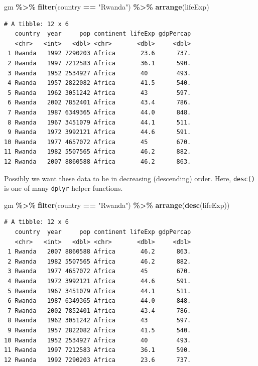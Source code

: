 \documentclass[
]{krantz}
\makeatletter
\newenvironment{Shaded}{\begin{snugshade}}{\end{snugshade}}
\newcommand{\KeywordTok}[1]{\textcolor[rgb]{0.27,0.27,0.27}{\textbf{#1}}}
\newcommand{\NormalTok}[1]{#1}
\newcommand{\OperatorTok}[1]{\textcolor[rgb]{0.43,0.43,0.43}{\textbf{#1}}}
\newcommand{\StringTok}[1]{\textcolor[rgb]{0.5,0.5,0.5}{#1}}
\newenvironment{kframe}{%
\medskip{}
\setlength{\fboxsep}{.8em}
 \def\at@end@of@kframe{}%
 \ifinner\ifhmode%
  \def\at@end@of@kframe{\end{minipage}}%
  \begin{minipage}{\columnwidth}%
 \fi\fi%
 \def\FrameCommand##1{\hskip\@totalleftmargin \hskip-\fboxsep
 \colorbox{shadecolor}{##1}\hskip-\fboxsep
     \hskip-\linewidth \hskip-\@totalleftmargin \hskip\columnwidth}%
 \MakeFramed {\advance\hsize-\width
   \@totalleftmargin\z@ \linewidth\hsize
   \@setminipage}}%
 {\par\unskip\endMakeFramed%
 \at@end@of@kframe}
\renewenvironment{Shaded}{\begin{kframe}}{\end{kframe}}
\makeatother
\begin{document}
\begin{Shaded}
\begin{Highlighting}[]
\NormalTok{gm }\OperatorTok{\%\textgreater{}\%}\StringTok{ }
\StringTok{  }\KeywordTok{filter}\NormalTok{(country }\OperatorTok{==}\StringTok{ "Rwanda"}\NormalTok{) }\OperatorTok{\%\textgreater{}\%}\StringTok{ }
\StringTok{  }\KeywordTok{arrange}\NormalTok{(lifeExp)}
\end{Highlighting}
\end{Shaded}

\begin{verbatim}
# A tibble: 12 x 6
   country  year     pop continent lifeExp gdpPercap
   <chr>   <int>   <dbl> <chr>       <dbl>     <dbl>
 1 Rwanda   1992 7290203 Africa       23.6      737.
 2 Rwanda   1997 7212583 Africa       36.1      590.
 3 Rwanda   1952 2534927 Africa       40        493.
 4 Rwanda   1957 2822082 Africa       41.5      540.
 5 Rwanda   1962 3051242 Africa       43        597.
 6 Rwanda   2002 7852401 Africa       43.4      786.
 7 Rwanda   1987 6349365 Africa       44.0      848.
 8 Rwanda   1967 3451079 Africa       44.1      511.
 9 Rwanda   1972 3992121 Africa       44.6      591.
10 Rwanda   1977 4657072 Africa       45        670.
11 Rwanda   1982 5507565 Africa       46.2      882.
12 Rwanda   2007 8860588 Africa       46.2      863.
\end{verbatim}

Possibly we want these data to be in decreasing (descending) order. Here, \texttt{desc()} is one of many \texttt{dplyr} helper functions.

\begin{Shaded}
\begin{Highlighting}[]
\NormalTok{gm }\OperatorTok{\%\textgreater{}\%}\StringTok{ }
\StringTok{  }\KeywordTok{filter}\NormalTok{(country }\OperatorTok{==}\StringTok{ "Rwanda"}\NormalTok{) }\OperatorTok{\%\textgreater{}\%}\StringTok{ }
\StringTok{  }\KeywordTok{arrange}\NormalTok{(}\KeywordTok{desc}\NormalTok{(lifeExp))}
\end{Highlighting}
\end{Shaded}

\begin{verbatim}
# A tibble: 12 x 6
   country  year     pop continent lifeExp gdpPercap
   <chr>   <int>   <dbl> <chr>       <dbl>     <dbl>
 1 Rwanda   2007 8860588 Africa       46.2      863.
 2 Rwanda   1982 5507565 Africa       46.2      882.
 3 Rwanda   1977 4657072 Africa       45        670.
 4 Rwanda   1972 3992121 Africa       44.6      591.
 5 Rwanda   1967 3451079 Africa       44.1      511.
 6 Rwanda   1987 6349365 Africa       44.0      848.
 7 Rwanda   2002 7852401 Africa       43.4      786.
 8 Rwanda   1962 3051242 Africa       43        597.
 9 Rwanda   1957 2822082 Africa       41.5      540.
10 Rwanda   1952 2534927 Africa       40        493.
11 Rwanda   1997 7212583 Africa       36.1      590.
12 Rwanda   1992 7290203 Africa       23.6      737.
\end{verbatim}
\end{document}

